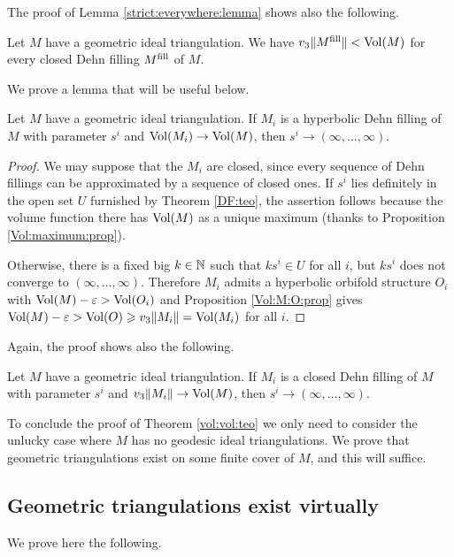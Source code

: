The proof of Lemma \ref{strict:everywhere:lemma} shows also the following.
\begin{lemma} \label{closed:decreases:lemma}
Let $M$ have a geometric ideal triangulation. We have $v_3\|M^{\rm fill}\| < {\rm Vol}(M)$ for every closed Dehn filling $M^{\rm fill}$ of $M$.
\end{lemma}

We prove a lemma that will be useful below.
\begin{lemma} 
Let $M$ have a geometric ideal triangulation. If $M_i$ is a hyperbolic Dehn filling of $M$ with parameter $s^i$ and ${\rm Vol}(M_i) \to {\rm Vol}(M)$, then $s^i \to (\infty,\ldots, \infty)$.
\end{lemma}
\begin{proof}
We may suppose that the $M_i$ are closed, since every sequence of Dehn fillings can be approximated by a sequence of closed ones. If $s^i$ lies definitely in the open set $U$ furnished by Theorem \ref{DF:teo}, the assertion follows because the volume function there has ${\rm Vol}(M)$ as a unique maximum (thanks to Proposition \ref{Vol:maximum:prop}). 

Otherwise, there is a fixed big $k\in\mathbb{N}$ such that $ks^i\in U$ for all $i$, but $ks^i$ does not converge to $(\infty,\ldots, \infty)$. Therefore $M_i$ admits a hyperbolic orbifold structure $O_i$ with ${\rm Vol}(M) - \varepsilon > {\rm Vol}(O_i) $ and Proposition \ref{Vol:M:O:prop} gives ${\rm Vol}(M) -\varepsilon > {\rm Vol}(O) \geqslant v_3\|M_i\| = {\rm Vol}(M_i)$ for all $i$. 
\end{proof}

Again, the proof shows also the following.
\begin{lemma} \label{sse:converge:lemma}
Let $M$ have a geometric ideal triangulation. If $M_i$ is a closed Dehn filling of $M$ with parameter $s^i$ and $v_3\|M_i\| \to {\rm Vol}(M)$, then $s^i \to (\infty, \ldots, \infty)$.
\end{lemma}

To conclude the proof of Theorem \ref{vol:vol:teo} we only need to consider the unlucky case where $M$ has no geodesic ideal triangulations. We prove that geometric triangulations exist on some finite cover of $M$, and this will suffice.

\subsection{Geometric triangulations exist virtually}
We prove here the following.

